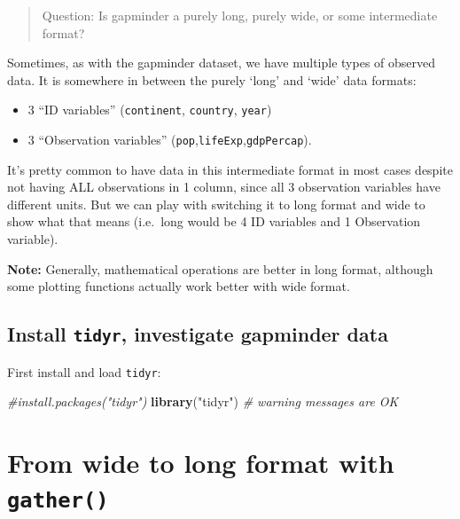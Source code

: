 \documentclass[]{book}
\newenvironment{Shaded}{\begin{snugshade}}{\end{snugshade}}
\newcommand{\KeywordTok}[1]{\textcolor[rgb]{0.13,0.29,0.53}{\textbf{{#1}}}}
\newcommand{\StringTok}[1]{\textcolor[rgb]{0.31,0.60,0.02}{{#1}}}
\newcommand{\CommentTok}[1]{\textcolor[rgb]{0.56,0.35,0.01}{\textit{{#1}}}}
\newcommand{\NormalTok}[1]{{#1}}
\providecommand{\tightlist}{%
  \setlength{\itemsep}{0pt}\setlength{\parskip}{0pt}}
\theoremstyle{definition}
\theoremstyle{definition}
\theoremstyle{definition}
\theoremstyle{remark}
\begin{document}
\begin{quote}
Question: Is gapminder a purely long, purely wide, or some intermediate
format?
\end{quote}

Sometimes, as with the gapminder dataset, we have multiple types of
observed data. It is somewhere in between the purely `long' and `wide'
data formats:

\begin{itemize}
\tightlist
\item
  3 ``ID variables'' (\texttt{continent}, \texttt{country},
  \texttt{year})
\item
  3 ``Observation variables''
  (\texttt{pop},\texttt{lifeExp},\texttt{gdpPercap}).
\end{itemize}

It's pretty common to have data in this intermediate format in most
cases despite not having ALL observations in 1 column, since all 3
observation variables have different units. But we can play with
switching it to long format and wide to show what that means (i.e.~long
would be 4 ID variables and 1 Observation variable).

\textbf{Note:} Generally, mathematical operations are better in long
format, although some plotting functions actually work better with wide
format.

\subsection{\texorpdfstring{Install \texttt{tidyr}, investigate
gapminder
data}{Install tidyr, investigate gapminder data}}\label{install-tidyr-investigate-gapminder-data}

First install and load \texttt{tidyr}:

\begin{Shaded}
\begin{Highlighting}[]
\CommentTok{#install.packages("tidyr")}
\KeywordTok{library}\NormalTok{(}\StringTok{"tidyr"}\NormalTok{) }\CommentTok{# warning messages are OK}
\end{Highlighting}
\end{Shaded}

\section{\texorpdfstring{From wide to long format with
\texttt{gather()}}{From wide to long format with gather()}}\label{from-wide-to-long-format-with-gather}
\end{document}
